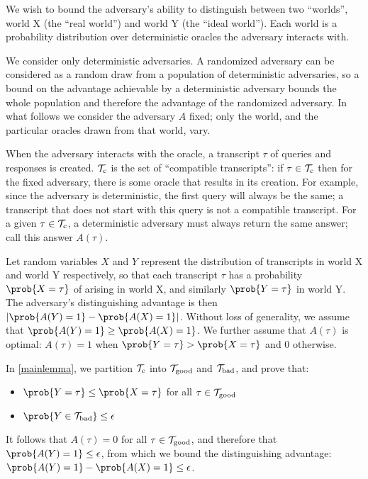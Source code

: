 \documentclass[hctr2.tex]{subfiles}
\begin{document}
We wish to bound the adversary's ability to distinguish between
two ``worlds'', world X (the ``real world'') and world Y (the ``ideal world'').
Each world is a probability distribution over
deterministic oracles the adversary interacts with.

We consider only deterministic adversaries.
A randomized adversary can be considered as a random draw
from a population of deterministic adversaries, so
a bound on the advantage achievable by a deterministic
adversary bounds the whole population and therefore
the advantage of the randomized adversary. In what follows
we consider the adversary \(A\) fixed; only the world, and the
particular oracles drawn from that world, vary.

When the adversary interacts with the oracle,
a transcript \(\tau\) of queries and responses is created.
\(\mathcal{T}_\mathrm{c}\) is the set of ``compatible transcripts'':
if \(\tau \in \mathcal{T}_\mathrm{c}\) then for the fixed adversary,
there is some oracle
that results in its creation. For example,
since the adversary is deterministic, the first query
will always be the same; a transcript that
does not start with this query is not a compatible transcript.
For a given \(\tau \in \mathcal{T}_\mathrm{c}\),
a deterministic adversary must always
return the same answer; call this answer \(A(\tau)\).

Let random variables \(X\) and \(Y\)
represent the distribution of transcripts
in world X and world Y respectively, so that
each transcript \(\tau\) has a probability \(\prob{X = \tau}\)
of arising in world X, and similarly \(\prob{Y = \tau}\) in world Y.
The adversary's distinguishing advantage is then
\(\left|\prob{A(Y) = 1} - \prob{A(X) = 1}\right|\).
Without loss of generality,
we assume that \(\prob{A(Y) = 1} \geq \prob{A(X) = 1}\).
We further assume that \(A(\tau)\) is optimal:
\(A(\tau) = 1\)
when \(\prob{Y = \tau} > \prob{X = \tau}\) and 0 otherwise.

In \autoref{mainlemma}, we partition \(\mathcal{T}_\mathrm{c}\) into \(\mathcal{T}_\mathrm{good}\) and \(\mathcal{T}_\mathrm{bad}\),
and prove that:
\begin{itemize}
    \item \(\prob{Y = \tau} \leq \prob{X = \tau}\) for all \(\tau \in \mathcal{T}_\mathrm{good}\)
    \item \(\prob{Y \in \Tb} \leq \epsilon\)
\end{itemize}
It follows that \(A(\tau) = 0\) for all \(\tau \in \mathcal{T}_\mathrm{good}\),
and therefore that \(\prob{A(Y) = 1} \leq \epsilon\),
from which we bound the distinguishing advantage:
\(\prob{A(Y) = 1} - \prob{A(X) = 1} \leq \epsilon\).
\end{document}
